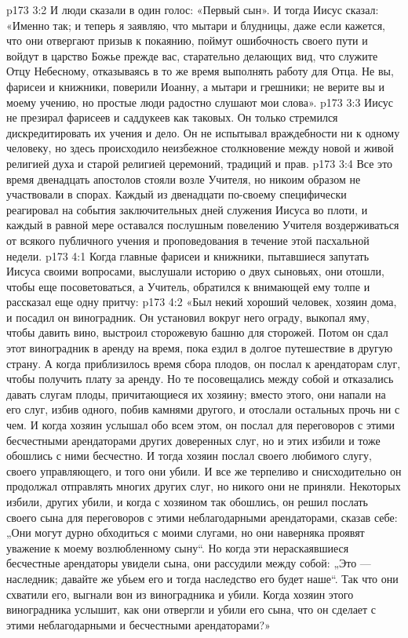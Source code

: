 \vs p173 3:2 И люди сказали в один голос: «Первый сын». И тогда Иисус сказал: «Именно так; и теперь я заявляю, что мытари и блудницы, даже если кажется, что они отвергают призыв к покаянию, поймут ошибочность своего пути и войдут в царство Божье прежде вас, старательно делающих вид, что служите Отцу Небесному, отказываясь в то же время выполнять работу для Отца. Не вы, фарисеи и книжники, поверили Иоанну, а мытари и грешники; не верите вы и моему учению, но простые люди радостно слушают мои слова».
\vs p173 3:3 Иисус не презирал фарисеев и саддукеев как таковых. Он только стремился дискредитировать их учения и дело. Он не испытывал враждебности ни к одному человеку, но здесь происходило неизбежное столкновение между новой и живой религией духа и старой религией церемоний, традиций и прав.
\vs p173 3:4 Все это время двенадцать апостолов стояли возле Учителя, но никоим образом не участвовали в спорах. Каждый из двенадцати по\hyp{}своему специфически реагировал на события заключительных дней служения Иисуса во плоти, и каждый в равной мере оставался послушным повелению Учителя воздерживаться от всякого публичного учения и проповедования в течение этой пасхальной недели.
\vs p173 4:1 Когда главные фарисеи и книжники, пытавшиеся запутать Иисуса своими вопросами, выслушали историю о двух сыновьях, они отошли, чтобы еще посоветоваться, а Учитель, обратился к внимающей ему толпе и рассказал еще одну притчу:
\vs p173 4:2 \pc «Был некий хороший человек, хозяин дома, и посадил он виноградник. Он установил вокруг него ограду, выкопал яму, чтобы давить вино, выстроил сторожевую башню для сторожей. Потом он сдал этот виноградник в аренду на время, пока ездил в долгое путешествие в другую страну. А когда приблизилось время сбора плодов, он послал к арендаторам слуг, чтобы получить плату за аренду. Но те посовещались между собой и отказались давать слугам плоды, причитающиеся их хозяину; вместо этого, они напали на его слуг, избив одного, побив камнями другого, и отослали остальных прочь ни с чем. И когда хозяин услышал обо всем этом, он послал для переговоров с этими бесчестными арендаторами других доверенных слуг, но и этих избили и тоже обошлись с ними бесчестно. И тогда хозяин послал своего любимого слугу, своего управляющего, и того они убили. И все же терпеливо и снисходительно он продолжал отправлять многих других слуг, но никого они не приняли. Некоторых избили, других убили, и когда с хозяином так обошлись, он решил послать своего сына для переговоров с этими неблагодарными арендаторами, сказав себе: „Они могут дурно обходиться с моими слугами, но они наверняка проявят уважение к моему возлюбленному сыну“. Но когда эти нераскаявшиеся бесчестные арендаторы увидели сына, они рассудили между собой: „Это --- наследник; давайте же убьем его и тогда наследство его будет наше“. Так что они схватили его, выгнали вон из виноградника и убили. Когда хозяин этого виноградника услышит, как они отвергли и убили его сына, что он сделает с этими неблагодарными и бесчестными арендаторами?»

